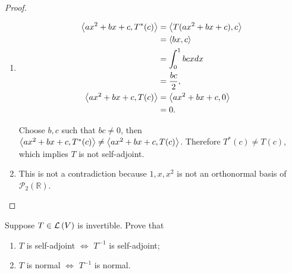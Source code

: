 \begin{proof}
    \begin{enumerate}[label={(\alph*)}]
        \item \begin{align*}
                  \left\langle{ax^{2} + bx + c, T^{*}(c)}\right\rangle & = \left\langle{T(ax^{2} + bx + c), c}\right\rangle \\
                                                        & = \left\langle{bx, c}\right\rangle                 \\
                                                        & = \int^{1}_{0}bcx dx                \\
                                                        & = \frac{bc}{2},                     \\
                  \left\langle{ax^{2} + bx + c, T(c)}\right\rangle     & = \left\langle{ax^{2} + bx + c, 0}\right\rangle    \\
                                                        & = 0.
              \end{align*}

              Choose $b, c$ such that $bc\ne 0$, then $\left\langle{ax^{2} + bx + c, T^{*}(c)}\right\rangle\ne \left\langle{ax^{2} + bx + c, T(c)}\right\rangle$. Therefore $T^{*}(c)\ne T(c)$, which implies $T$ is not self-adjoint.
        \item This is not a contradiction because $1, x, x^{2}$ is not an orthonormal basis of $\mathscr{P}_{2}(\mathbb{R})$.
    \end{enumerate}
\end{proof}
\newpage

\begin{exercise}
    Suppose $T\in\mathcal{L}\left({V}\right)$ is invertible. Prove that
    \begin{enumerate}[label={(\alph*)}]
        \item $T$ is self-adjoint $\Longleftrightarrow$ $T^{-1}$ is self-adjoint;
        \item $T$ is normal $\Longleftrightarrow$ $T^{-1}$ is normal.
    \end{enumerate}
\end{exercise}

